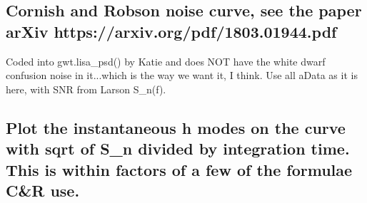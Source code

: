 \documentclass[11pt]{article}
\begin{document}
    \subsection{Cornish and Robson noise curve, see the paper arXiv
https://arxiv.org/pdf/1803.01944.pdf}\label{cornish-and-robson-noise-curve-see-the-paper-arxiv-httpsarxiv.orgpdf1803.01944.pdf}

    Coded into gwt.lisa\_psd() by Katie and does NOT have the white dwarf
confusion noise in it...which is the way we want it, I think. Use all
aData as it is here, with SNR from Larson S\_n(f).

    \subsection{Plot the instantaneous h modes on the curve with sqrt of
S\_n divided by integration time. This is within factors of a few of the
formulae C\&R
use.}\label{plot-the-instantaneous-h-modes-on-the-curve-with-sqrt-of-s_n-divided-by-integration-time.-this-is-within-factors-of-a-few-of-the-formulae-cr-use.}
\end{document}
